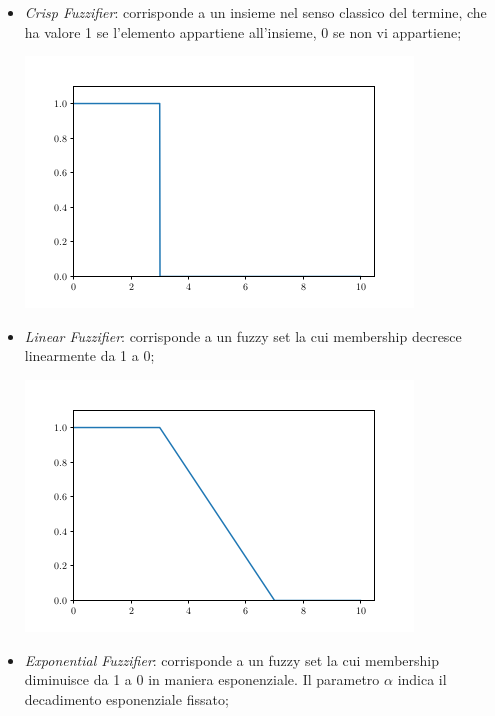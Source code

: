 \documentclass[12pt,a4paper]{report}
\begin{document}
\begin{itemize}
\item \emph{Crisp Fuzzifier}: corrisponde a un insieme nel senso classico del termine, che ha valore 1 se l'elemento appartiene all'insieme, 0 se non vi appartiene;

\begin{minipage}{\linewidth}
	\centering
      \includegraphics[width=0.8\linewidth]{images/crispFuzzifier.png}
\end{minipage}

\item \emph{Linear Fuzzifier}: corrisponde a un fuzzy set la cui membership decresce linearmente da 1 a 0;


\begin{minipage}{\linewidth}
	\centering
      \includegraphics[width=0.8\linewidth]{images/linearFuzzifier.png}
\end{minipage}

\item \emph{Exponential Fuzzifier}: corrisponde a un fuzzy set la cui  membership diminuisce da 1 a 0 in maniera esponenziale. Il parametro $\alpha$ indica il decadimento esponenziale fissato;


\end{itemize}
\end{document}
